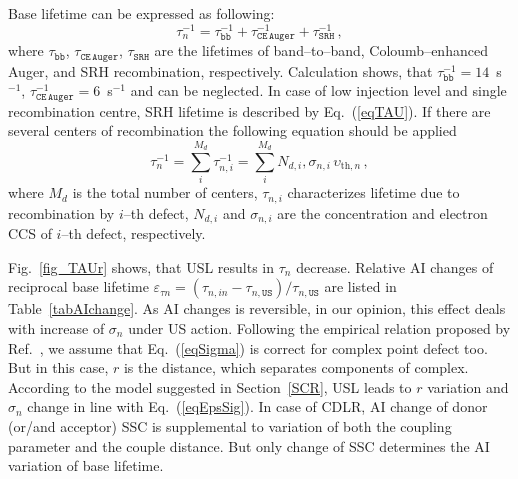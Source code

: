 \documentclass[aip,jap, amsmath,amssymb,reprint]{revtex4-1}
\begin{document}
Base lifetime can be expressed as following:\cite{MurphyJAP2011}
\begin{equation}
\label{eqTAUsum}
\tau_n^{-1}=\tau_\mathtt{bb}^{-1}+\tau_\mathtt{CE\,Auger}^{-1}+\tau_\mathtt{SRH}^{-1}\,,
\end{equation}
where
$\tau_\mathtt{bb}$, $\tau_\mathtt{CE\,Auger}$, $\tau_\mathtt{SRH}$ are the lifetimes of band--to--band, Coloumb--enhanced Auger, and
SRH recombination, respectively.
Calculation shows, that $\tau_\mathtt{bb}^{-1}=14$~s$^{-1}$, $\tau_\mathtt{CE\,Auger}^{-1}=6$~s$^{-1}$ and can be neglected.
In case of low injection level and single recombination centre, SRH lifetime is described by Eq.~(\ref{eqTAU}).
If there are  several centers of recombination the following equation should be applied
\begin{equation}
\label{eqTAUSHRsum}
\tau_n^{-1}=\sum_i^{M_d}\tau_{n,i}^{-1}=\sum_i^{M_d}N_{d,i},\sigma_{n,i}\,\upsilon_{\mathrm{th},n}\,,
\end{equation}
where
$M_d$ is the total number of centers,
$\tau_{n,i}$ characterizes lifetime due to recombination by $i$--th defect,
$N_{d,i}$ and $\sigma_{n,i}$ are the concentration and electron CCS of $i$--th defect, respectively.

Fig.~\ref{fig_TAUr} shows, that USL results in $\tau_n$ decrease.
Relative AI changes of reciprocal base lifetime $\varepsilon_{\tau n}=(\tau_{n,in}-\tau_{n,\mathtt{US}})/\tau_{n,\mathtt{US}}$
are listed in Table~\ref{tabAIchange}.
As AI changes is reversible, in our opinion, this effect deals with increase of $\sigma_n$ under US action.
Following the empirical relation  proposed by Ref.~, we assume that Eq.~(\ref{eqSigma})
is correct for complex point defect too.
But in this case, $r$ is the distance, which separates components of complex.
According to the model suggested in Section~\ref{SCR}, USL leads to $r$ variation
and $\sigma_n$ change in line with Eq.~(\ref{eqEpsSig}).
In case of CDLR, AI change of donor (or/and acceptor) SSC is supplemental to variation of
both the coupling parameter and the couple distance.
But only change of SSC determines the AI variation of base lifetime.
\end{document}
